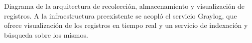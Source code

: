 \label{fig:logs}
\captionStyle
Diagrama de la arquitectura de recolección, almacenamiento y
visualización de registros. A la infraestructura preexistente se
acopló el servicio Graylog, que ofrece visualización de los registros
en tiempo real y un servicio de indexación y búsqueda sobre los
mismos.
